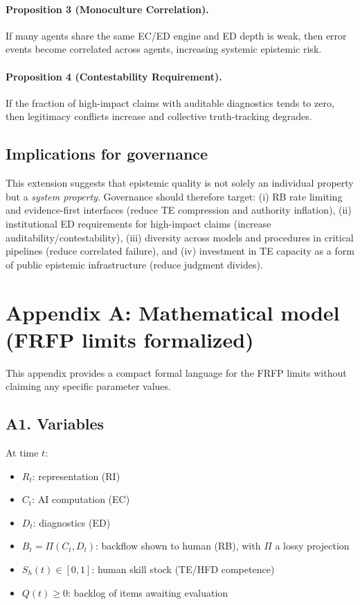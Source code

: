 \paragraph{Proposition 3 (Monoculture Correlation).}
If many agents share the same EC/ED engine and ED depth is weak, then error events become correlated across agents, increasing systemic epistemic risk.

\paragraph{Proposition 4 (Contestability Requirement).}
If the fraction of high-impact claims with auditable diagnostics tends to zero, then legitimacy conflicts increase and collective truth-tracking degrades.

\subsection{Implications for governance}
This extension suggests that epistemic quality is not solely an individual property but a \emph{system property}. Governance should therefore target:
(i) RB rate limiting and evidence-first interfaces (reduce TE compression and authority inflation),
(ii) institutional ED requirements for high-impact claims (increase auditability/contestability),
(iii) diversity across models and procedures in critical pipelines (reduce correlated failure),
and (iv) investment in TE capacity as a form of public epistemic infrastructure (reduce judgment divides).


\newpage
\appendix
\section*{Appendix A: Mathematical model (FRFP limits formalized)}

This appendix provides a compact formal language for the FRFP limits without claiming any specific parameter values.

\subsection*{A1. Variables}
At time $t$:
\begin{itemize}[leftmargin=*]
  \item $R_t$: representation (RI)
  \item $C_t$: AI computation (EC)
  \item $D_t$: diagnostics (ED)
  \item $B_t = \Pi(C_t, D_t)$: backflow shown to human (RB), with $\Pi$ a lossy projection
  \item $S_h(t)\in[0,1]$: human skill stock (TE/HFD competence)
  \item $Q(t)\ge 0$: backlog of items awaiting evaluation
\end{itemize}

